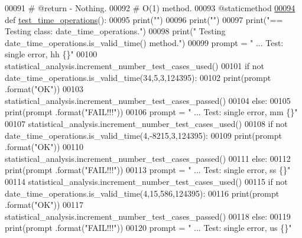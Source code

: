 \begin{DoxyCode}
00091     \textcolor{comment}{#   @return - Nothing.}
00092     \textcolor{comment}{#   O(1) method.}
00093     @staticmethod
\hypertarget{date__time__processing__tester_8py_source_l00094}{}\hyperlink{classutilities_1_1date__time__processing__tester_1_1date__time__operations__tester_a024182086c48b718cc794b100501eb79}{00094}     \textcolor{keyword}{def }\hyperlink{classutilities_1_1date__time__processing__tester_1_1date__time__operations__tester_a024182086c48b718cc794b100501eb79}{test\_time\_operations}():
00095         print(\textcolor{stringliteral}{""})
00096         print(\textcolor{stringliteral}{""})
00097         print(\textcolor{stringliteral}{"==   Testing class: date\_time\_operations."})
00098         print(\textcolor{stringliteral}{" Testing date\_time\_operations.is\_valid\_time() method."})
00099         prompt = \textcolor{stringliteral}{"  ... Test: single error, hh              \{\}"}
00100         statistical\_analysis.increment\_number\_test\_cases\_used()
00101         \textcolor{keywordflow}{if} \textcolor{keywordflow}{not} date\_time\_operations.is\_valid\_time(34,5,3,124395):
00102             print(prompt .format(\textcolor{stringliteral}{"OK"}))
00103             statistical\_analysis.increment\_number\_test\_cases\_passed()
00104         \textcolor{keywordflow}{else}:
00105             print(prompt .format(\textcolor{stringliteral}{"FAIL!!!"}))
00106         prompt = \textcolor{stringliteral}{"  ... Test: single error, mm              \{\}"}
00107         statistical\_analysis.increment\_number\_test\_cases\_used()
00108         \textcolor{keywordflow}{if} \textcolor{keywordflow}{not} date\_time\_operations.is\_valid\_time(4,-8215,3,124395):
00109             print(prompt .format(\textcolor{stringliteral}{"OK"}))
00110             statistical\_analysis.increment\_number\_test\_cases\_passed()
00111         \textcolor{keywordflow}{else}:
00112             print(prompt .format(\textcolor{stringliteral}{"FAIL!!!"}))
00113         prompt = \textcolor{stringliteral}{"  ... Test: single error, ss              \{\}"}
00114         statistical\_analysis.increment\_number\_test\_cases\_used()
00115         \textcolor{keywordflow}{if} \textcolor{keywordflow}{not} date\_time\_operations.is\_valid\_time(4,15,586,124395):
00116             print(prompt .format(\textcolor{stringliteral}{"OK"}))
00117             statistical\_analysis.increment\_number\_test\_cases\_passed()
00118         \textcolor{keywordflow}{else}:
00119             print(prompt .format(\textcolor{stringliteral}{"FAIL!!!"}))
00120         prompt = \textcolor{stringliteral}{"  ... Test: single error, us              \{\}"}

\end{DoxyCode}
